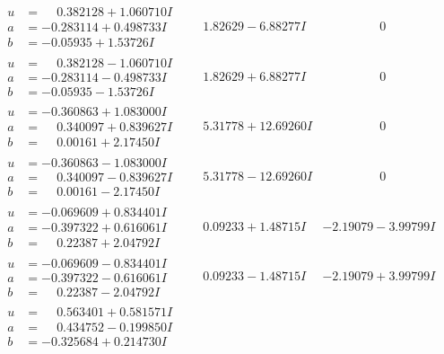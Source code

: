 \documentclass[1p]{elsarticle_modified}
\theoremstyle{definition}
\begin{document}
$$\begin{array}{c|c|c}
\begin{aligned}
u &= \phantom{-}0.382128 + 1.060710 I \\
a &= -0.283114 + 0.498733 I \\
b &= -0.05935 + 1.53726 I\end{aligned}
 & \phantom{-}1.82629 - 6.88277 I & \phantom{-0.000000 } 0 \\ \hline\begin{aligned}
u &= \phantom{-}0.382128 - 1.060710 I \\
a &= -0.283114 - 0.498733 I \\
b &= -0.05935 - 1.53726 I\end{aligned}
 & \phantom{-}1.82629 + 6.88277 I & \phantom{-0.000000 } 0 \\ \hline\begin{aligned}
u &= -0.360863 + 1.083000 I \\
a &= \phantom{-}0.340097 + 0.839627 I \\
b &= \phantom{-}0.00161 + 2.17450 I\end{aligned}
 & \phantom{-}5.31778 + 12.69260 I & \phantom{-0.000000 } 0 \\ \hline\begin{aligned}
u &= -0.360863 - 1.083000 I \\
a &= \phantom{-}0.340097 - 0.839627 I \\
b &= \phantom{-}0.00161 - 2.17450 I\end{aligned}
 & \phantom{-}5.31778 - 12.69260 I & \phantom{-0.000000 } 0 \\ \hline\begin{aligned}
u &= -0.069609 + 0.834401 I \\
a &= -0.397322 + 0.616061 I \\
b &= \phantom{-}0.22387 + 2.04792 I\end{aligned}
 & \phantom{-}0.09233 + 1.48715 I & -2.19079 - 3.99799 I \\ \hline\begin{aligned}
u &= -0.069609 - 0.834401 I \\
a &= -0.397322 - 0.616061 I \\
b &= \phantom{-}0.22387 - 2.04792 I\end{aligned}
 & \phantom{-}0.09233 - 1.48715 I & -2.19079 + 3.99799 I \\ \hline\begin{aligned}
u &= \phantom{-}0.563401 + 0.581571 I \\
a &= \phantom{-}0.434752 - 0.199850 I \\
b &= -0.325684 + 0.214730 I\end{aligned}

\end{array}$$
\end{document}

